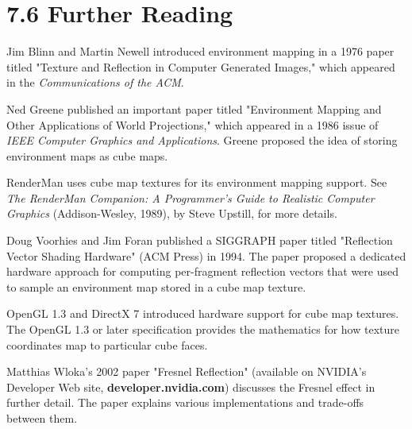 \documentclass[../main.tex]{subfiles}
\begin{document}
\section{7.6 Further Reading}

Jim Blinn and Martin Newell introduced environment mapping in a 1976 paper titled "Texture and Reflection in Computer Generated Images," which appeared in the \textit{Communications of the ACM}.

Ned Greene published an important paper titled "Environment Mapping and Other Applications of World Projections," which appeared in a 1986 issue of \textit{IEEE Computer Graphics and Applications}. Greene proposed the idea of storing environment maps as cube maps.

RenderMan uses cube map textures for its environment mapping support. See \textit{The RenderMan Companion: A Programmer's Guide to Realistic Computer Graphics} (Addison-Wesley, 1989), by Steve Upstill, for more details.

Doug Voorhies and Jim Foran published a SIGGRAPH paper titled "Reflection Vector Shading Hardware" (ACM Press) in 1994. The paper proposed a dedicated hardware approach for computing per-fragment reflection vectors that were used to sample an environment map stored in a cube map texture.

OpenGL 1.3 and DirectX 7 introduced hardware support for cube map textures. The OpenGL 1.3 or later specification provides the mathematics for how texture coordinates map to particular cube faces.

Matthias Wloka's 2002 paper "Fresnel Reflection" (available on NVIDIA's Developer Web site, \textbf{developer.nvidia.com}) discusses the Fresnel effect in further detail. The paper explains various implementations and trade-offs between them.
\end{document}

